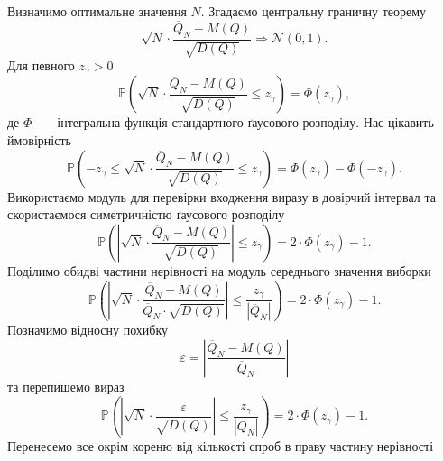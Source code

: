 Визначимо оптимальне значення $N$.
Згадаємо центральну граничну теорему
\begin{equation*}
  \sqrt{N}
    \cdot \frac{\overline{Q}_N - M\left( Q \right)}
    {\sqrt{D\left( Q \right)}} \Rightarrow \mathcal{N}\left( 0, 1 \right).
\end{equation*}
Для певного $z_{\gamma} > 0$
\begin{equation*}
  \mathbb{P}\left(
    \sqrt{N}
    \cdot \frac{\overline{Q}_N - M\left( Q \right)}{\sqrt{D\left( Q \right)}}
    \le z_{\gamma}
  \right) = \Phi\left( z_{\gamma} \right),
\end{equation*}
де $\Phi$~---~інтегральна функція стандартного ґаусового розподілу.
Нас цікавить ймовірність
\begin{equation*}
  \mathbb{P}\left(
    -z_{\gamma} \le
    \sqrt{N}
    \cdot \frac{\overline{Q}_N - M\left( Q \right)}{\sqrt{D\left( Q \right)}}
    \le z_{\gamma}
  \right)
  = \Phi\left( z_{\gamma} \right) - \Phi\left( -z_{\gamma} \right).
\end{equation*}
Використаємо модуль для перевірки входження виразу в довірчий інтервал
та скористаємося симетричністю ґаусового розподілу
\begin{equation*}
  \mathbb{P}\left(
    \left|
      \sqrt{N}
      \cdot \frac{\overline{Q}_N - M\left( Q \right)}{\sqrt{D\left( Q \right)}}
    \right|
    \le z_{\gamma}
  \right)
  = 2 \cdot \Phi\left( z_{\gamma} \right) - 1.
\end{equation*}
Поділимо обидві частини нерівності на модуль середнього значення виборки
\begin{equation*}
  \mathbb{P}\left(
    \left|
      \sqrt{N}
      \cdot \frac{\overline{Q}_N - M\left( Q \right)}
        {\overline{Q}_N \cdot \sqrt{D\left( Q \right)}}
    \right|
    \le \frac{z_{\gamma}}{\left| \overline{Q}_N \right|}
  \right)
  = 2 \cdot \Phi\left( z_{\gamma} \right) - 1.
\end{equation*}
Позначимо відносну похибку
\begin{equation*}
  \varepsilon
  = \left| \frac{\overline{Q}_N - M\left( Q \right)}{\overline{Q}_N} \right|
\end{equation*}
та перепишемо вираз
\begin{equation*}
  \mathbb{P}\left(
    \left|
      \sqrt{N}
      \cdot \frac{\varepsilon}
        {\sqrt{D\left( Q \right)}}
    \right|
    \le \frac{z_{\gamma}}{\left| \overline{Q}_N \right|}
  \right)
  = 2 \cdot \Phi\left( z_{\gamma} \right) - 1.
\end{equation*}
Перенесемо все окрім кореню від кількості спроб в праву частину нерівності
